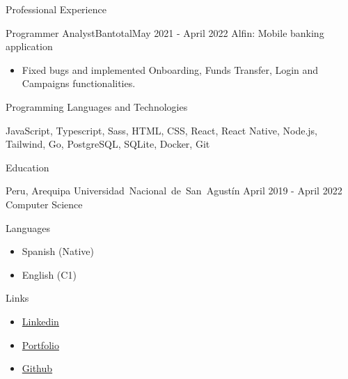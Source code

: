 \documentclass[]{mcdowell-cv/mcdowellcv}
\begin{document}
\begin{cvsection}{Professional Experience}
\begin{cvsubsection}{Programmer Analyst}{Bantotal}{May 2021 - April 2022}
            Alfin: Mobile banking application
            \begin{itemize}
                \item Fixed bugs and implemented Onboarding, Funds Transfer, Login and Campaigns functionalities.
            \end{itemize}

        \end{cvsubsection}
    \end{cvsection}

    \begin{cvsection}{Programming Languages and Technologies}
        \begin{cvsubsection}{}{}{}
            JavaScript, Typescript, Sass, HTML, CSS, React, React Native, Node.js, Tailwind, Go, PostgreSQL, SQLite, Docker, Git
        \end{cvsubsection}
    \end{cvsection}

    \begin{cvsection}{Education}
        \begin{cvsubsection}
        {Peru, Arequipa}
        {\mbox{Universidad Nacional de San Agustín}}
        {April 2019 - April 2022}
            Computer Science
        \end{cvsubsection}
    \end{cvsection}

    \begin{cvsection}{Languages}
        \begin{cvsubsection}{}{}{}
            \begin{itemize}
                \item Spanish (Native)
                \item English (C1)
            \end{itemize}
        \end{cvsubsection}
    \end{cvsection}

    \begin{cvsection}{Links}
        \begin{cvsubsection}{}{}{}
            \begin{itemize}
                \item \href{https://www.linkedin.com/in/luis-angel-prado-postigo-813916231/}{Linkedin}
                \item \href{https://luis-prado-portfolio.netlify.app/}{Portfolio}
                \item \href{https://github.com/lpradopostigo}{Github}
            \end{itemize}
        \end{cvsubsection}
    \end{cvsection}
\end{document}

